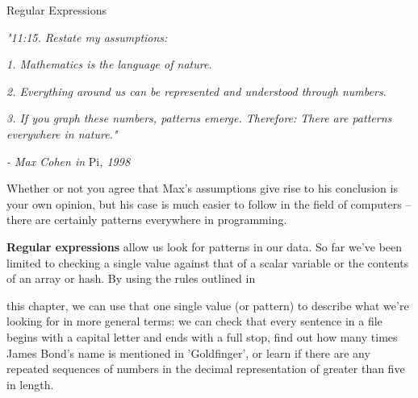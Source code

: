 \documentclass[a4paper,11pt]{book}
\begin{document}

\noindent 

\noindent 

\noindent 

\noindent 

\noindent 

\noindent 

\noindent 

\noindent 

\noindent 

\noindent 

\noindent 

\noindent 

\noindent 

\noindent 

\noindent 

\noindent Regular Expressions

\noindent 

\noindent 

\noindent 

\noindent 

\noindent \textit{"11:15. Restate my assumptions:}

\noindent 

\noindent \textit{1. Mathematics is the language of nature.}

\noindent \textit{2. Everything around us can be represented and understood through numbers.}

\noindent \textit{3. If you graph these numbers, patterns emerge. Therefore: There are patterns everywhere in nature."}

\noindent 

\noindent \textit{- Max Cohen in }Pi\textit{, 1998}

\noindent 

\noindent Whether or not you agree that Max's assumptions give rise to his conclusion is your own opinion, but his case is much easier to follow in the field of computers -- there are certainly patterns everywhere in programming.

\noindent 

\noindent \textbf{Regular expressions }allow us look for patterns in our data. So far we've been limited to checking a single value against that of a scalar variable or the contents of an array or hash. By using the rules outlined in

\noindent this chapter, we can use that one single value (or pattern) to describe what we're looking for in more general terms: we can check that every sentence in a file begins with a capital letter and ends with a full stop, find out how many times James Bond's name is mentioned in 'Goldfinger', or learn if there are any repeated sequences of numbers in the decimal representation of    greater than five in length.
\end{document}
